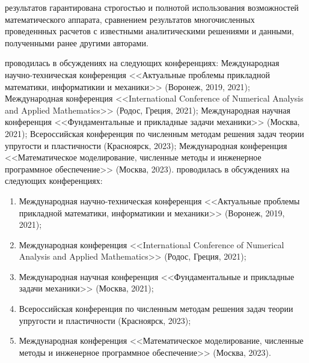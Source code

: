 {\reliability} результатов гарантирована строгостью и полнотой использования возможностей математического аппарата, сравнением результатов многочисленных проведеннных расчетов с известными аналитическими решениями и данными, полученными ранее другими авторами.

\ifsynopsis
{\probation} проводилась в обсуждениях на следующих конференциях:
Международная научно-техническая конференция <<Актуальные проблемы прикладной математики, информатикии и механики>> (Воронеж, 2019, 2021); Международная конференция <<International Conference of Numerical Analysis and Applied Mathematics>> (Родос, Греция, 2021); Международная научная конференция <<Фундаментальные и прикладные задачи механики>> (Москва, 2021); Всероссийская конференция по численным методам решения задач теории упругости и пластичности (Красноярск, 2023); Международная конференция <<Математическое моделирование, численные методы и инженерное программное обеспечение>> (Москва, 2023).
\else
{\probation} проводилась в обсуждениях на следующих конференциях:
\begin{enumerate}
	\item Международная научно-техническая конференция <<Актуальные проблемы прикладной математики, информатикии и механики>> (Воронеж, 2019, 2021);
	\item Международная конференция <<International Conference of Numerical Analysis and Applied Mathematics>> (Родос, Греция, 2021);
	\item Международная научная конференция <<Фундаментальные и прикладные задачи механики>> (Москва, 2021);
	\item Всероссийская конференция по численным методам решения задач теории упругости и пластичности (Красноярск, 2023);
	\item Международная конференция <<Математическое моделирование, численные методы и инженерное программное обеспечение>> (Москва, 2023).
\end{enumerate}
\fi


